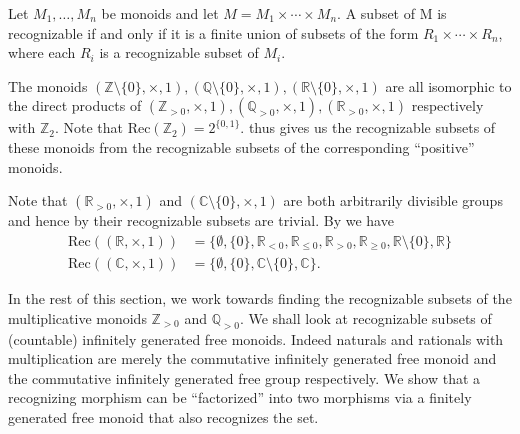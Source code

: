 \documentclass{llncs}
\begin{document}
\begin{theorem}
   Let $M_1,\ldots, M_n$ be monoids and let $M = M_1 \times \cdots \times
		M_n$. A subset of M is recognizable if and only if it is a finite union of subsets
	of the form $R_1 \times \cdots \times R_n$, where each $R_i$ is a recognizable subset of $M_i$.
 \label{thm:mezei}
\end{theorem}

\begin{remark}
    The monoids $(\mathbb{Z} \setminus \{0\}, \times, 1), (\mathbb{Q} \setminus \{0\}, \times, 1),(\mathbb{R}\setminus \{0\}, \times , 1)$ are all isomorphic to the direct products of $(\mathbb{Z}_{> 0}, \times, 1), (\mathbb{Q}_{> 0}, \times, 1),(\mathbb{R}_{> 0}, \times, 1)$ respectively with $\mathbb{Z}_2$. Note that $\text{Rec}(\mathbb{Z}_2) = 2^{\{0,1\}}$.  thus gives us the recognizable subsets of these monoids from the recognizable subsets of the corresponding ``positive'' monoids.
  \label{rem:Rec-multiplicative-monoids-with-negatives}
\end{remark}

\begin{remark}
  Note that $(\mathbb{R}_{> 0}, \times, 1)$ and $(\mathbb{C} \setminus \{0\}, \times, 1)$ are both arbitrarily divisible groups and hence by  their recognizable subsets are trivial. By  we have
  \begin{align*}
    \text{Rec}((\mathbb{R}, \times, 1)) &= \{\emptyset, \{0\}, \mathbb{R}_{<0}, \mathbb{R}_{\le 0}, \mathbb{R}_{>0}, \mathbb{R}_{\ge 0}, \mathbb{R} \setminus \{0\}, \mathbb{R}\}\\
    \text{Rec}((\mathbb{C}, \times, 1)) &= \{\emptyset, \{0\},  \mathbb{C}  \setminus \{0\}, \mathbb{C}\}.
  \end{align*}
  \label{rem:rec-reals-and-complex-under-multipication}
\end{remark}

In the rest of this section, we work towards finding the recognizable subsets of the multiplicative monoids $\mathbb{Z}_{>0}$ and $\mathbb{Q}_{>0}$.
We shall look at recognizable subsets of (countable) infinitely generated free monoids. Indeed naturals and rationals with multiplication are merely the commutative infinitely generated free monoid and the commutative infinitely generated free group respectively. We show that a recognizing morphism can be ``factorized'' into two morphisms via a finitely generated free monoid that also recognizes the set.
\end{document}
